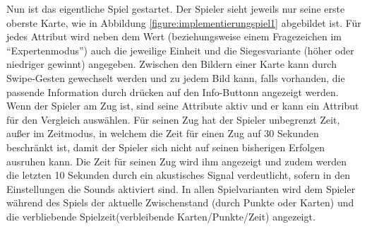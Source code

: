 Nun ist das eigentliche Spiel gestartet. Der Spieler sieht jeweils nur seine erste oberste Karte, wie in Abbildung \ref{figure:implementierungspiel1} abgebildet ist. Für jedes Attribut wird neben dem Wert (beziehungsweise einem Fragezeichen im ``Expertenmodus'') auch die jeweilige Einheit und die Siegesvariante (höher oder niedriger gewinnt) angegeben. Zwischen den Bildern einer Karte kann durch Swipe-Gesten gewechselt werden und zu jedem Bild kann, falls vorhanden, die passende Information durch drücken auf den Info-Buttonn angezeigt werden. Wenn der Spieler am Zug ist, sind seine Attribute aktiv und er kann ein Attribut für den Vergleich auswählen. Für seinen Zug hat der Spieler unbegrenzt Zeit, außer im Zeitmodus, in welchem die Zeit für einen Zug auf 30 Sekunden beschränkt ist, damit der Spieler sich nicht auf seinen bisherigen Erfolgen ausruhen kann. Die Zeit für seinen Zug wird ihm angezeigt und zudem werden die letzten 10 Sekunden durch ein akustisches Signal verdeutlicht, sofern in den Einstellungen die Sounds aktiviert sind. In allen Spielvarianten wird dem Spieler während des Spiels der aktuelle Zwischenstand (durch Punkte oder Karten) und die verbliebende Spielzeit(verbleibende Karten/Punkte/Zeit) angezeigt.\\

